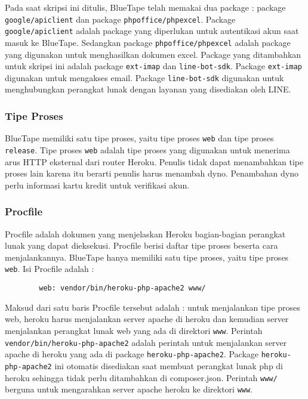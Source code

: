		Pada saat skripsi ini ditulis, BlueTape telah memakai dua package : package \texttt{google/apiclient} dan package \texttt{phpoffice/phpexcel}. Package \texttt{google/apiclient} adalah package yang diperlukan untuk autentikasi akun saat masuk ke BlueTape. Sedangkan package \texttt{phpoffice/phpexcel} adalah package yang digunakan untuk menghasilkan dokumen excel. Package yang ditambahkan untuk skripsi ini adalah package \texttt{ext-imap} dan \texttt{line-bot-sdk}. Package \texttt{ext-imap} digunakan untuk mengakses email. Package \texttt{line-bot-sdk} digunakan untuk menghubungkan perangkat lunak dengan layanan yang disediakan oleh LINE.
		
	\subsubsection{Tipe Proses}
		BlueTape memiliki satu tipe proses, yaitu tipe proses \texttt{web} dan tipe proses \texttt{release}. Tipe proses \texttt{web} adalah tipe proses yang digunakan untuk menerima arus HTTP eksternal dari router Heroku. Penulis tidak dapat menambahkan tipe proses lain karena itu berarti penulis harus menambah dyno. Penambahan dyno perlu informasi kartu kredit untuk verifikasi akun.
		
	\subsubsection{Procfile}
		Procfile adalah dokumen yang menjelaskan Heroku bagian-bagian perangkat lunak yang dapat dieksekusi. Procfile berisi daftar tipe proses beserta cara menjalankannya. BlueTape hanya memiliki satu tipe proses, yaitu tipe proses \texttt{web}. Isi Procfile adalah :
		\begin{lstlisting}
		web: vendor/bin/heroku-php-apache2 www/
		\end{lstlisting}
		
		Maksud dari satu baris Procfile tersebut adalah : untuk menjalankan tipe proses web, heroku harus menjalankan server apache di heroku dan kemudian server menjalankan perangkat lunak web yang ada di direktori \texttt{www}. Perintah \texttt{vendor/bin/heroku-php-apache2} adalah perintah untuk menjalankan server apache di heroku yang ada di package \texttt{heroku-php-apache2}. Package \texttt{heroku-php-apache2} ini otomatis disediakan saat membuat perangkat lunak php di heroku sehingga tidak perlu ditambahkan di composer.json. Perintah \texttt{www/} berguna untuk mengarahkan server apache heroku ke direktori \texttt{www}.
		
